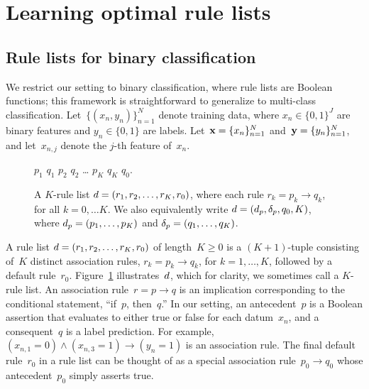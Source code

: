 \section{Learning optimal rule lists}

\subsection{Rule lists for binary classification}
\label{sec:setup}

We restrict our setting to binary classification,
where rule lists are Boolean functions;
this framework is straightforward to generalize to multi-class classification.
%
Let~${\{(x_n, y_n)\}_{n=1}^N}$ denote training data,
where ${x_n \in \{0, 1\}^J}$ are binary features and ${y_n \in \{0, 1\}}$ are labels.
%
Let~${\mathbf{x} = \{x_n\}_{n=1}^N}$ and~${\mathbf{y} = \{y_n\}_{n=1}^N}$,
and let~${x_{n,j}}$ denote the $j$-th feature of~$x_n$.

\begin{figure}[b!]
\begin{algorithmic}
\normalsize
\State \bif $p_1$ \bthen $q_1$
\State \belif $p_2$ \bthen $q_2$
\State \dots
\State \belif $p_K$ \bthen $q_K$
\State \belse $q_0$.
\end{algorithmic}
\caption{A $K$-rule list ${{d} = (r_1, r_2, \dots, r_K, r_0)}$, where
each rule ${r_k = p_k \rightarrow q_k}$, for all ${k = 0, \dots K}$.
We also equivalently write ${{d} = (d_p, \delta_p, q_0, K)}$,
where ${d_p = (p_1, \dots, p_K)}$
and ${\delta_p = (q_1, \dots, q_K)}$.}
\label{fig:rule-list}
\end{figure}

A rule list ${{d} = (r_1, r_2, \dots, r_K, r_0)}$ of length~${K \ge 0}$
is a ${(K+1)}$-tuple consisting of~$K$ distinct association rules,
${r_k = p_k \rightarrow q_k}$, for ${k = 1, \dots, K}$,
followed by a default rule~$r_0$.
%
Figure~\ref{fig:rule-list} illustrates~${d}$,
which for clarity, we sometimes call a $K$-rule list.
%
An association rule~${r = p \rightarrow q}$ is an implication
corresponding to the conditional statement, ``if~$p$, then~$q$.''
%
In our setting, an antecedent~$p$ is a Boolean assertion that
evaluates to either true or false for each datum~$x_n$,
and a consequent~$q$ is a label prediction.
%
For example, ${(x_{n, 1} = 0) \wedge (x_{n, 3} = 1) \rightarrow (y_n = 1)}$
is an association rule.
%
%
The final default rule~$r_0$ in a rule list can be thought of
as a special association rule~${p_0 \rightarrow q_0}$
whose antecedent~$p_0$ simply asserts true.


